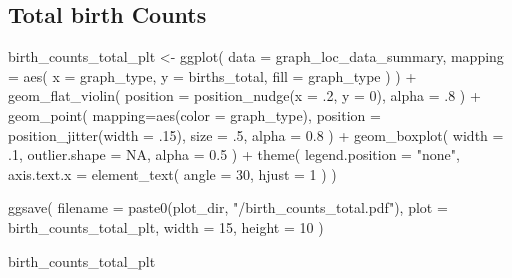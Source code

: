 \documentclass[
]{book}
\newenvironment{Shaded}{\begin{snugshade}}{\end{snugshade}}
\newcommand{\AttributeTok}[1]{\textcolor[rgb]{0.77,0.63,0.00}{#1}}
\newcommand{\ConstantTok}[1]{\textcolor[rgb]{0.00,0.00,0.00}{#1}}
\newcommand{\DecValTok}[1]{\textcolor[rgb]{0.00,0.00,0.81}{#1}}
\newcommand{\FloatTok}[1]{\textcolor[rgb]{0.00,0.00,0.81}{#1}}
\newcommand{\FunctionTok}[1]{\textcolor[rgb]{0.00,0.00,0.00}{#1}}
\newcommand{\NormalTok}[1]{#1}
\newcommand{\OtherTok}[1]{\textcolor[rgb]{0.56,0.35,0.01}{#1}}
\newcommand{\SpecialCharTok}[1]{\textcolor[rgb]{0.00,0.00,0.00}{#1}}
\newcommand{\StringTok}[1]{\textcolor[rgb]{0.31,0.60,0.02}{#1}}
\begin{document}
\hypertarget{total-birth-counts-1}{%
\subsection{Total birth Counts}\label{total-birth-counts-1}}

\begin{Shaded}
\begin{Highlighting}[]
\NormalTok{birth\_counts\_total\_plt }\OtherTok{\textless{}{-}} \FunctionTok{ggplot}\NormalTok{(}
    \AttributeTok{data =}\NormalTok{ graph\_loc\_data\_summary,}
    \AttributeTok{mapping =} \FunctionTok{aes}\NormalTok{(}
      \AttributeTok{x =}\NormalTok{ graph\_type,}
      \AttributeTok{y =}\NormalTok{ births\_total,}
      \AttributeTok{fill =}\NormalTok{ graph\_type}
\NormalTok{    )}
\NormalTok{  ) }\SpecialCharTok{+}
  \FunctionTok{geom\_flat\_violin}\NormalTok{(}
    \AttributeTok{position =} \FunctionTok{position\_nudge}\NormalTok{(}\AttributeTok{x =}\NormalTok{ .}\DecValTok{2}\NormalTok{, }\AttributeTok{y =} \DecValTok{0}\NormalTok{),}
    \AttributeTok{alpha =}\NormalTok{ .}\DecValTok{8}
\NormalTok{  ) }\SpecialCharTok{+}
  \FunctionTok{geom\_point}\NormalTok{(}
    \AttributeTok{mapping=}\FunctionTok{aes}\NormalTok{(}\AttributeTok{color =}\NormalTok{ graph\_type),}
    \AttributeTok{position =} \FunctionTok{position\_jitter}\NormalTok{(}\AttributeTok{width =}\NormalTok{ .}\DecValTok{15}\NormalTok{),}
    \AttributeTok{size =}\NormalTok{ .}\DecValTok{5}\NormalTok{,}
    \AttributeTok{alpha =} \FloatTok{0.8}
\NormalTok{  ) }\SpecialCharTok{+}
  \FunctionTok{geom\_boxplot}\NormalTok{(}
    \AttributeTok{width =}\NormalTok{ .}\DecValTok{1}\NormalTok{,}
    \AttributeTok{outlier.shape =} \ConstantTok{NA}\NormalTok{,}
    \AttributeTok{alpha =} \FloatTok{0.5}
\NormalTok{  ) }\SpecialCharTok{+}
  \FunctionTok{theme}\NormalTok{(}
    \AttributeTok{legend.position =} \StringTok{"none"}\NormalTok{,}
    \AttributeTok{axis.text.x =} \FunctionTok{element\_text}\NormalTok{(}
      \AttributeTok{angle =} \DecValTok{30}\NormalTok{,}
      \AttributeTok{hjust =} \DecValTok{1}
\NormalTok{    )}
\NormalTok{  )}

\FunctionTok{ggsave}\NormalTok{(}
  \AttributeTok{filename =} \FunctionTok{paste0}\NormalTok{(plot\_dir, }\StringTok{"/birth\_counts\_total.pdf"}\NormalTok{),}
  \AttributeTok{plot =}\NormalTok{ birth\_counts\_total\_plt,}
  \AttributeTok{width =} \DecValTok{15}\NormalTok{,}
  \AttributeTok{height =} \DecValTok{10}
\NormalTok{)}

\NormalTok{birth\_counts\_total\_plt}
\end{Highlighting}
\end{Shaded}
\end{document}
